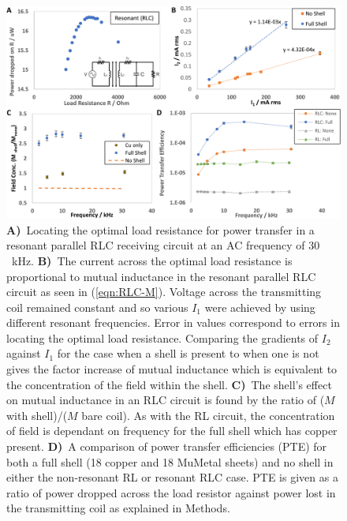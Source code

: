 \documentclass[11pt]{iopart}
\begin{document}
\begin{figure}
  \begin{center}
   \noindent\includegraphics[width=0.9\linewidth]{images/compoundRLC-error.pdf}
  \end{center}
  \caption{
    \textbf{A)}~Locating the optimal load resistance for power transfer in a resonant
    parallel RLC receiving circuit at an AC frequency of $30$~kHz.
    \textbf{B)}~The current across the optimal load resistance is proportional to
    mutual inductance in the resonant parallel RLC circuit as seen in
    (\ref{eqn:RLC-M}). Voltage across the transmitting coil
    remained constant and so various $I_1$ were achieved by using
    different resonant frequencies. Error in values correspond to
    errors in locating the optimal load resistance. Comparing the
    gradients of $I_2$
    against $I_1$ for the case when a shell is present to when one is
    not gives the factor increase of mutual inductance which
    is equivalent to the concentration of the field within the shell.
    \textbf{C)}~The shell's effect on mutual inductance in an RLC circuit is
    found by the ratio of ($M$ with shell)/($M$ bare coil). As with
    the RL circuit, the concentration of field is dependant on
    frequency for the full shell which has copper present.
    \textbf{D)}~A comparison of power transfer efficiencies (PTE) for both a
    full shell (18 copper and 18 MuMetal sheets) and no shell in either
    the non-resonant RL or resonant RLC case. PTE is given as a ratio of power dropped
    across the load resistor against power lost in the transmitting
    coil as explained in Methods.
  }
  \label{fig:cpdRLC}
  \vspace{-0.7em}
\end{figure}
\end{document}
